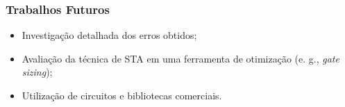 \documentclass[10pt,a4paper]{beamer}
\begin{document}
		\begin{frame}
		\frametitle{Trabalhos Futuros}
			\begin{itemize}
				\item Investigação detalhada dos erros obtidos;
				
				\item Avaliação da técnica de STA em uma ferramenta de otimização (e. g., \textit{gate sizing});
				
				\item Utilização de circuitos e bibliotecas comerciais.
			\end{itemize}
		\end{frame}
		
	\section*{}
	\frame{\titlepage}
	
\end{document}
